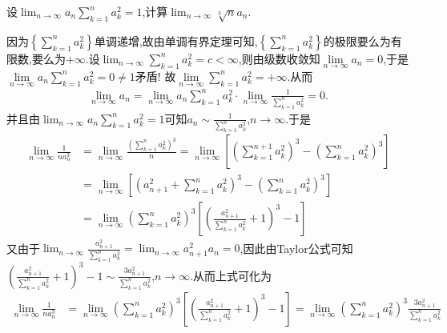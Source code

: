 \documentclass[../../main.tex]{subfiles}%
\begin{document}
\begin{example}
设\(\lim_{n \to \infty} a_n \sum\limits_{k = 1}^{n} a_{k}^{2} = 1\),计算\(\lim_{n \to \infty} \sqrt[3]{n}a_n\).
\end{example}
\begin{solution}

因为\(\left\{\sum\limits_{k = 1}^n{a_{k}^{2}}\right\}\)单调递增,故由单调有界定理可知,\(\left\{\sum\limits_{k = 1}^n{a_{k}^{2}}\right\}\)的极限要么为有限数,要么为\(+\infty\).设\(\lim_{n\rightarrow\infty}\sum\limits_{k = 1}^n{a_{k}^{2}}=c <\infty\),则由级数收敛知$\lim\limits_{n\rightarrow \infty}a_n=0$,于是$\lim\limits_{n\rightarrow \infty}a_n\sum_{k=1}^n{a_{k}^{2}}=0\ne 1$矛盾!
故$\lim\limits_{n\rightarrow \infty}\sum_{k=1}^n{a_{k}^{2}}=+\infty$.从而
\begin{align*}
\lim\limits_{n\rightarrow \infty}a_n=\lim\limits_{n\rightarrow \infty}a_n\sum_{k=1}^n{a_{k}^{2}}\cdot \lim\limits_{n\rightarrow \infty}\frac{1}{\sum\limits_{k=1}^n{a_{k}^{2}}}=0.
\end{align*}
并且由\(\lim_{n\rightarrow\infty}a_n\sum\limits_{k = 1}^n{a_{k}^{2}}=1\)可知\(a_n\sim\frac{1}{\sum\limits_{k = 1}^n{a_{k}^{2}}}\),\(n\rightarrow\infty\).于是
\begin{align*}
\lim_{n\rightarrow\infty}\frac{1}{na_{n}^{3}}&=\lim_{n\rightarrow\infty}\frac{\left(\sum\limits_{k = 1}^n{a_{k}^{2}}\right)^3}{n}=\lim_{n\rightarrow\infty}\left[\left(\sum\limits_{k = 1}^{n + 1}{a_{k}^{2}}\right)^3-\left(\sum\limits_{k = 1}^n{a_{k}^{2}}\right)^3\right]\\
&=\lim_{n\rightarrow\infty}\left[\left(a_{n + 1}^{2}+\sum\limits_{k = 1}^n{a_{k}^{2}}\right)^3-\left(\sum\limits_{k = 1}^n{a_{k}^{2}}\right)^3\right]\\
&=\lim_{n\rightarrow\infty}\left(\sum\limits_{k = 1}^n{a_{k}^{2}}\right)^3\left[\left(\frac{a_{n + 1}^{2}}{\sum\limits_{k = 1}^n{a_{k}^{2}}}+1\right)^3 - 1\right]
\end{align*}
又由于\(\lim_{n\rightarrow\infty}\frac{a_{n + 1}^{2}}{\sum\limits_{k = 1}^n{a_{k}^{2}}}=\lim_{n\rightarrow\infty}a_{n + 1}^{2}a_n = 0\),因此由Taylor公式可知\(\left(\frac{a_{n + 1}^{2}}{\sum\limits_{k = 1}^n{a_{k}^{2}}}+1\right)^3 - 1\sim\frac{3a_{n + 1}^{2}}{\sum\limits_{k = 1}^n{a_{k}^{2}}}\),\(n\rightarrow\infty\).从而上式可化为
\begin{align*}
\lim_{n\rightarrow\infty}\frac{1}{na_{n}^{3}}&=\lim_{n\rightarrow\infty}\left(\sum\limits_{k = 1}^n{a_{k}^{2}}\right)^3\left[\left(\frac{a_{n + 1}^{2}}{\sum\limits_{k = 1}^n{a_{k}^{2}}}+1\right)^3 - 1\right]=\lim_{n\rightarrow\infty}\left(\sum\limits_{k = 1}^n{a_{k}^{2}}\right)^3\frac{3a_{n + 1}^{2}}{\sum\limits_{k = 1}^n{a_{k}^{2}}}\\

\end{align*}
\end{solution}
\end{document}
